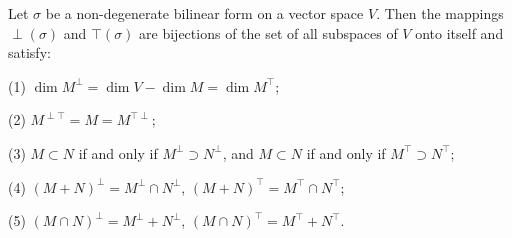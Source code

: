 Let $\sigma$ be a non-degenerate bilinear form on a vector space $V$. Then the mappings $\perp(\sigma)$ and $\top(\sigma)$ are bijections of the set of all subspaces of $V$ onto itself and satisfy:

(1) $\dim M^{\perp} = \dim V - \dim M = \dim M^{\top}$;

(2) $M^{\perp \top} = M = M^{\top \perp}$;

(3) $M \subset N$ if and only if $M^{\perp} \supset N^{\perp}$, and $M \subset N$ if and only if $M^{\top} \supset N^{\top}$;

(4) $(M + N)^{\perp} = M^{\perp} \cap N^{\perp}$, $(M + N)^{\top} = M^{\top} \cap N^{\top}$;

(5) $(M \cap N)^{\perp} = M^{\perp} + N^{\perp}$, $(M \cap N)^{\top} = M^{\top} + N^{\top}$.
